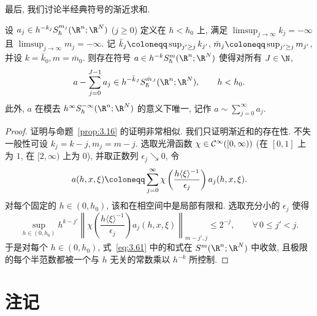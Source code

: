 最后, 我们讨论半经典符号的渐近求和.

\begin{proposition}[半经典符号的渐近求和]\label{prop:3.25}
设 $a_j \in h^{-k_j} S_\hbar^{m_j}(\R^n; \R^N)$ ($j \ge 0$) 定义在 $h < h_0$ 上, 满足 $\limsup_{j\to\infty} k_j = -\infty$ 且 $\limsup_{j\to\infty} m_j = -\infty$. 记 $\bar{k}_j \defeq \sup_{j' \ge j} k_{j'}$, $\bar{m}_j \defeq \sup_{j' \ge j} m_{j'}$, 并设 $k = \bar{k}_0, m = \bar{m}_0$. 则存在符号 $a \in h^{-k} S_\hbar^m(\R^n; \R^N)$ 使得对所有 $J \in \N$,
\begin{equation}\label{eq:3.60}
    a - \sum_{j=0}^{J-1} a_j \in h^{-\bar{k}_J} S_\hbar^{\bar{m}_J}(\R^n; \R^N), \qquad h < h_0.
\end{equation}
此外, $a$ 在模去 $h^\infty S_\hbar^{-\infty}(\R^n; \R^N)$ 的意义下唯一, 记作 $a \sim \sum_{j=0}^\infty a_j$.
\end{proposition}

\begin{proof}
证明与命题~\ref{prop:3.16} 的证明非常相似. 我们只证明渐近和的存在性. 不失一般性可设 $k_j = k - j, m_j = m - j$. 选取光滑函数 $\chi \in \mathcal{C}^\infty([0, \infty))$ (在 $[0, 1]$ 上为 $1$, 在 $[2, \infty)$ 上为 $0$), 并取正数列 $\epsilon_j \searrow 0$, 令
\begin{equation}\label{eq:3.61}
    a(h, x, \xi) \defeq \sum_{j=0}^\infty \chi\left( \frac{h \langle \xi \rangle^{-1}}{\epsilon_j} \right) a_j(h, x, \xi).
\end{equation}
对每个固定的 $h \in (0, h_0)$, 该和在相空间中是局部有限和. 选取充分小的 $\epsilon_j$ 使得
\begin{equation}\label{eq:3.62}
    \sup_{h \in (0, h_0)} h^{k - j'} \left\| \chi\left( \frac{h \langle \xi \rangle^{-1}}{\epsilon_j} \right) a_j(h, x, \xi) \right\|_{m - j', j} \le 2^{-j}, \qquad \forall\,0 \le j' < j.
\end{equation}
于是对每个 $h \in (0, h_0)$, 式~\eqref{eq:3.61} 中的和式在 $S^m(\R^n; \R^N)$ 中收敛, 且极限的每个半范数都被一个与 $h$ 无关的常数乘以 $h^{-k}$ 所控制.
\end{proof}

\section*{注记}

